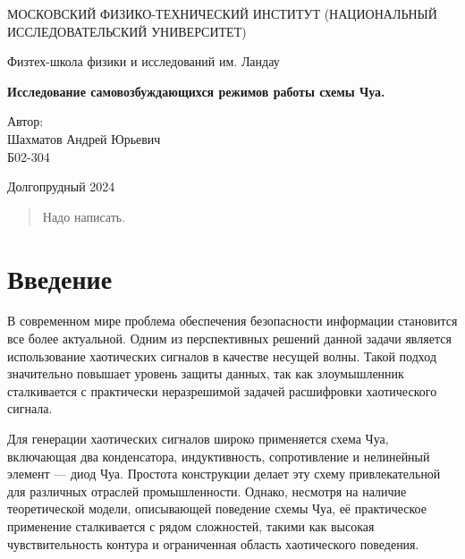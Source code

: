 \documentclass[12pt]{article}
\date{\today}
\begin{document}
\begin{titlepage}
	\begin{center}
		{\large МОСКОВСКИЙ ФИЗИКО-ТЕХНИЧЕСКИЙ ИНСТИТУТ (НАЦИОНАЛЬНЫЙ ИССЛЕДОВАТЕЛЬСКИЙ УНИВЕРСИТЕТ)}
	\end{center}
	\begin{center}
		{\large Физтех-школа физики и исследований им. Ландау}
	\end{center}

	\vspace{3cm}
	{\huge
		\begin{center}
			\textbf{Исследование самовозбуждающихся режимов работы схемы Чуа.}
		\end{center}
	}
	\vspace{2cm}
	\begin{flushright}
		{\LARGE Автор:\\ Шахматов Андрей Юрьевич \\
			\vspace{0.2cm}
			Б02-304}
	\end{flushright}
	\vspace{7 cm}
	\begin{center}
		Долгопрудный 2024
	\end{center}
	\thispagestyle{empty}
\end{titlepage}


\begin{abstract}
	Надо написать.
\end{abstract}


\section*{Введение}
В современном мире проблема обеспечения безопасности информации становится все более актуальной.
Одним из перспективных решений данной задачи является использование хаотических сигналов в качестве несущей волны.
Такой подход значительно повышает уровень защиты данных,
так как злоумышленник сталкивается с практически неразрешимой задачей расшифровки хаотического сигнала.

Для генерации хаотических сигналов широко применяется схема Чуа, включающая два конденсатора,
индуктивность, сопротивление и нелинейный элемент --- диод Чуа.
Простота конструкции делает эту схему привлекательной для различных отраслей промышленности.
Однако, несмотря на наличие теоретической модели, описывающей поведение схемы Чуа,
её практическое применение сталкивается с рядом сложностей, такими как высокая чувствительность контура и
ограниченная область хаотического поведения.
\end{document}
